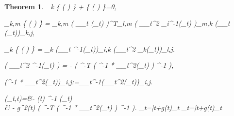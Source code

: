 \documentclass{article}
\newtheorem{theorem}{Theorem}\newtheorem{proposition}{Proposition}
\theoremstyle{definition}
\theoremstyle{remark}
\newcommand*\diff{\mathop{}\!\mathrm{d}}
\begin{document}
\begin{theorem}
	\sum_{k} \left \{   \left (  \right ) \right \}  +  \left \{   \left ( \right ) \right \}=0,
	
	\sum_{k,m}  \left \{   \left (  \right ) \right \}  = \sum_{k,m} \big( \nabla_{_{t}} (_{t}) \big)^{T}_{l,m} \big( \nabla_{_{t}}^{2} _{i}^{-1}(_{t}) \big)_{m,k} \big(\nabla_{_{t}} (_{t})\big)_{k,j},
	
	\sum_{k} \left \{   \left ( \right ) \right \} =  \sum_{k} \big(\nabla_{_{t}} ^{-1}(_{t})\big)_{i,k} \big(\nabla_{_{t}}^{2} _{k}(_{t})\big)_{l,j}.
	
	 \left ( \nabla_{_{t}}^{2} ^{-1}(_{t})    \right ) = -   \left (  ^{-T} \left ( ^{-1} * \nabla_{_{t}}^{2}(_{t})  \right )  ^{-1} \right ),
	
	\Big(^{-1} * \nabla_{_{t}}^{2}(_{t})\Big)_{i,j}:=\nabla_{_{t}}^{-1}\Big(\nabla_{_{t}}^{2}(_{t})\Big)_{i,j}.
	
	(_{t},t)=&- \beta(t) ^{-1} (_{t})\\
	& -  g^{2}(t)   \left (  ^{-T} \left ( ^{-1} * \nabla_{_{t}}^{2}(_{t})  \right )  ^{-1} \right ).
	\label{eq:full_score}
	\diff{}_{t}=\diff\bar{t}+g(t)\diff{}_{t}
	\label{eq:rotation_free_score}
	\diff{}_{t}=\diff\bar{t}+g(t)\diff{}_{t}
	

\end{theorem}
\end{document}
